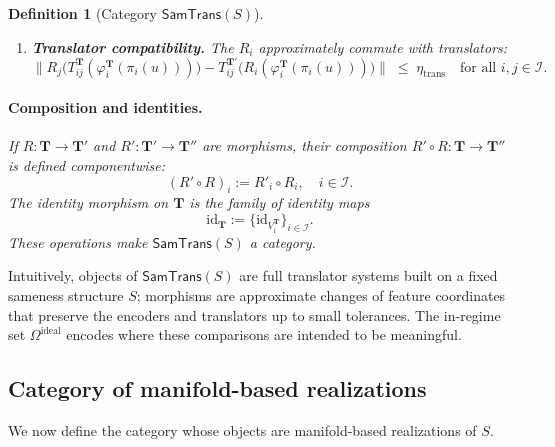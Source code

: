 \documentclass[11pt]{article}
\newtheorem{definition}{Definition}
\newcommand{\SamTrans}{\mathsf{SamTrans}}
\begin{document}
\begin{definition}[Category $\SamTrans(S)$]
\begin{enumerate}[]
\item \textbf{Translator compatibility.} The $R_i$ approximately commute with translators:
\begin{equation}
\label{eq:tsr-trans-compat}
\bigl\|
R_j\bigl(T_{ij}^{\mathbf{T}}(\varphi_i^{\mathbf{T}}(\pi_i(u)))\bigr)
-
T_{ij}^{\mathbf{T}'}\bigl(R_i(\varphi_i^{\mathbf{T}}(\pi_i(u)))\bigr)
\bigr\|
\;\le\;
\eta_{\mathrm{trans}}
\quad
\text{for all } i,j \in \mathcal{I}.
\end{equation}
\end{enumerate}

\paragraph{Composition and identities.}
If $R : \mathbf{T} \to \mathbf{T}'$ and $R' : \mathbf{T}' \to \mathbf{T}''$ are morphisms, their
composition $R' \circ R : \mathbf{T} \to \mathbf{T}''$ is defined componentwise:
\[
(R' \circ R)_i := R'_i \circ R_i, \quad i \in \mathcal{I}.
\]
The identity morphism on $\mathbf{T}$ is the family of identity maps
\[
\mathrm{id}_{\mathbf{T}} := \{\mathrm{id}_{V_i^{\mathbf{T}}}\}_{i\in\mathcal{I}}.
\]
These operations make $\SamTrans(S)$ a category.
\end{definition}

Intuitively, objects of $\SamTrans(S)$ are full translator systems built on a fixed sameness structure
$S$; morphisms are approximate changes of feature coordinates that preserve the encoders and
translators up to small tolerances. The in-regime set $\Omega^{\mathrm{ideal}}$ encodes where these
comparisons are intended to be meaningful.

\subsection{Category of manifold-based realizations}
\label{subsec:samgeom}

We now define the category whose objects are manifold-based realizations of $S$.
\end{document}
